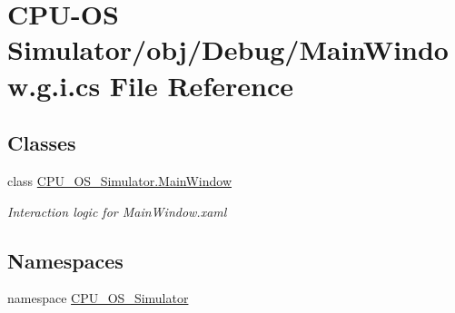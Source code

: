 \hypertarget{_c_p_u-_o_s_01_simulator_2obj_2_debug_2_main_window_8g_8i_8cs}{}\section{C\+P\+U-\/\+O\+S Simulator/obj/\+Debug/\+Main\+Window.g.\+i.\+cs File Reference}
\label{_c_p_u-_o_s_01_simulator_2obj_2_debug_2_main_window_8g_8i_8cs}
\subsection*{Classes}
\begin{DoxyCompactItemize}
\item 
class \hyperlink{class_c_p_u___o_s___simulator_1_1_main_window}{C\+P\+U\+\_\+\+O\+S\+\_\+\+Simulator.\+Main\+Window}
\begin{DoxyCompactList}\small\item\em Interaction logic for Main\+Window.\+xaml \end{DoxyCompactList}\end{DoxyCompactItemize}
\subsection*{Namespaces}
\begin{DoxyCompactItemize}
\item 
namespace \hyperlink{namespace_c_p_u___o_s___simulator}{C\+P\+U\+\_\+\+O\+S\+\_\+\+Simulator}
\end{DoxyCompactItemize}
